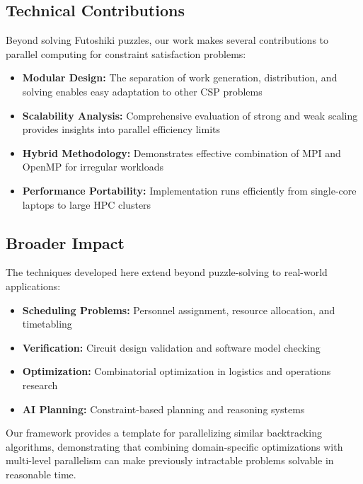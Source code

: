 \subsection{Technical Contributions}
Beyond solving Futoshiki puzzles, our work makes several contributions to parallel computing for constraint satisfaction problems:

\begin{itemize}
    \item \textbf{Modular Design:} The separation of work generation, distribution, and solving enables easy adaptation to other CSP problems
    \item \textbf{Scalability Analysis:} Comprehensive evaluation of strong and weak scaling provides insights into parallel efficiency limits
    \item \textbf{Hybrid Methodology:} Demonstrates effective combination of MPI and OpenMP for irregular workloads
    \item \textbf{Performance Portability:} Implementation runs efficiently from single-core laptops to large HPC clusters
\end{itemize}

\subsection{Broader Impact}
The techniques developed here extend beyond puzzle-solving to real-world applications:
\begin{itemize}
    \item \textbf{Scheduling Problems:} Personnel assignment, resource allocation, and timetabling
    \item \textbf{Verification:} Circuit design validation and software model checking
    \item \textbf{Optimization:} Combinatorial optimization in logistics and operations research
    \item \textbf{AI Planning:} Constraint-based planning and reasoning systems
\end{itemize}

Our framework provides a template for parallelizing similar backtracking algorithms, demonstrating that combining domain-specific optimizations with multi-level parallelism can make previously intractable problems solvable in reasonable time.